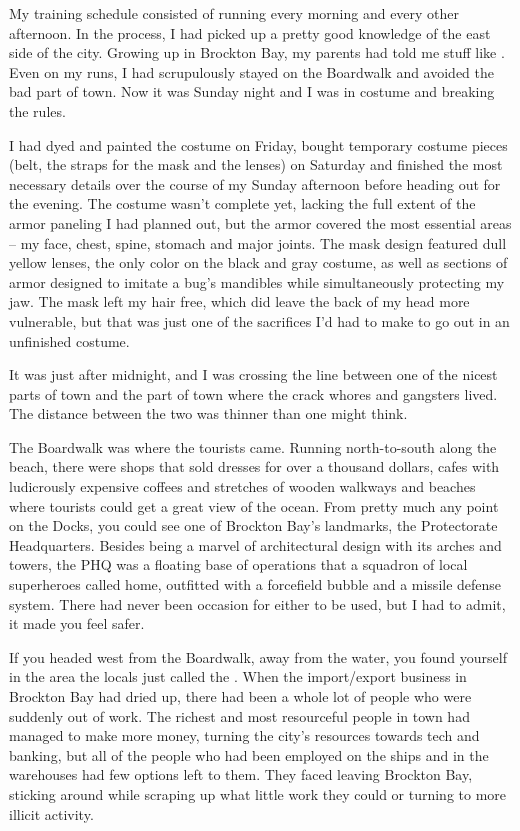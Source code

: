 My training schedule consisted of running every morning and every other afternoon. In the process, I had picked up a pretty good knowledge of the east side of the city. Growing up in Brockton Bay, my parents had told me stuff like . Even on my runs, I had scrupulously stayed on the Boardwalk and avoided the bad part of town. Now it was Sunday night and I was in costume and breaking the rules.

I had dyed and painted the costume on Friday, bought temporary costume pieces (belt, the straps for the mask and the lenses) on Saturday and finished the most necessary details over the course of my Sunday afternoon before heading out for the evening. The costume wasn't complete yet, lacking the full extent of the armor paneling I had planned out, but the armor covered the most essential areas -- my face, chest, spine, stomach and major joints. The mask design featured dull yellow lenses, the only color on the black and gray costume, as well as sections of armor designed to imitate a bug's mandibles while simultaneously protecting my jaw. The mask left my hair free, which did leave the back of my head more vulnerable, but that was just one of the sacrifices I'd had to make to go out in an unfinished costume.

It was just after midnight, and I was crossing the line between one of the nicest parts of town and the part of town where the crack whores and gangsters lived. The distance between the two was thinner than one might think.

The Boardwalk was where the tourists came. Running north-to-south along the beach, there were shops that sold dresses for over a thousand dollars, cafes with ludicrously expensive coffees and stretches of wooden walkways and beaches where tourists could get a great view of the ocean. From pretty much any point on the Docks, you could see one of Brockton Bay's landmarks, the Protectorate Headquarters. Besides being a marvel of architectural design with its arches and towers, the PHQ was a floating base of operations that a squadron of local superheroes called home, outfitted with a forcefield bubble and a missile defense system. There had never been occasion for either to be used, but I had to admit, it made you feel safer.

If you headed west from the Boardwalk, away from the water, you found yourself in the area the locals just called the . When the import/export business in Brockton Bay had dried up, there had been a whole lot of people who were suddenly out of work. The richest and most resourceful people in town had managed to make more money, turning the city's resources towards tech and banking, but all of the people who had been employed on the ships and in the warehouses had few options left to them. They faced leaving Brockton Bay, sticking around while scraping up what little work they could or turning to more illicit activity.

